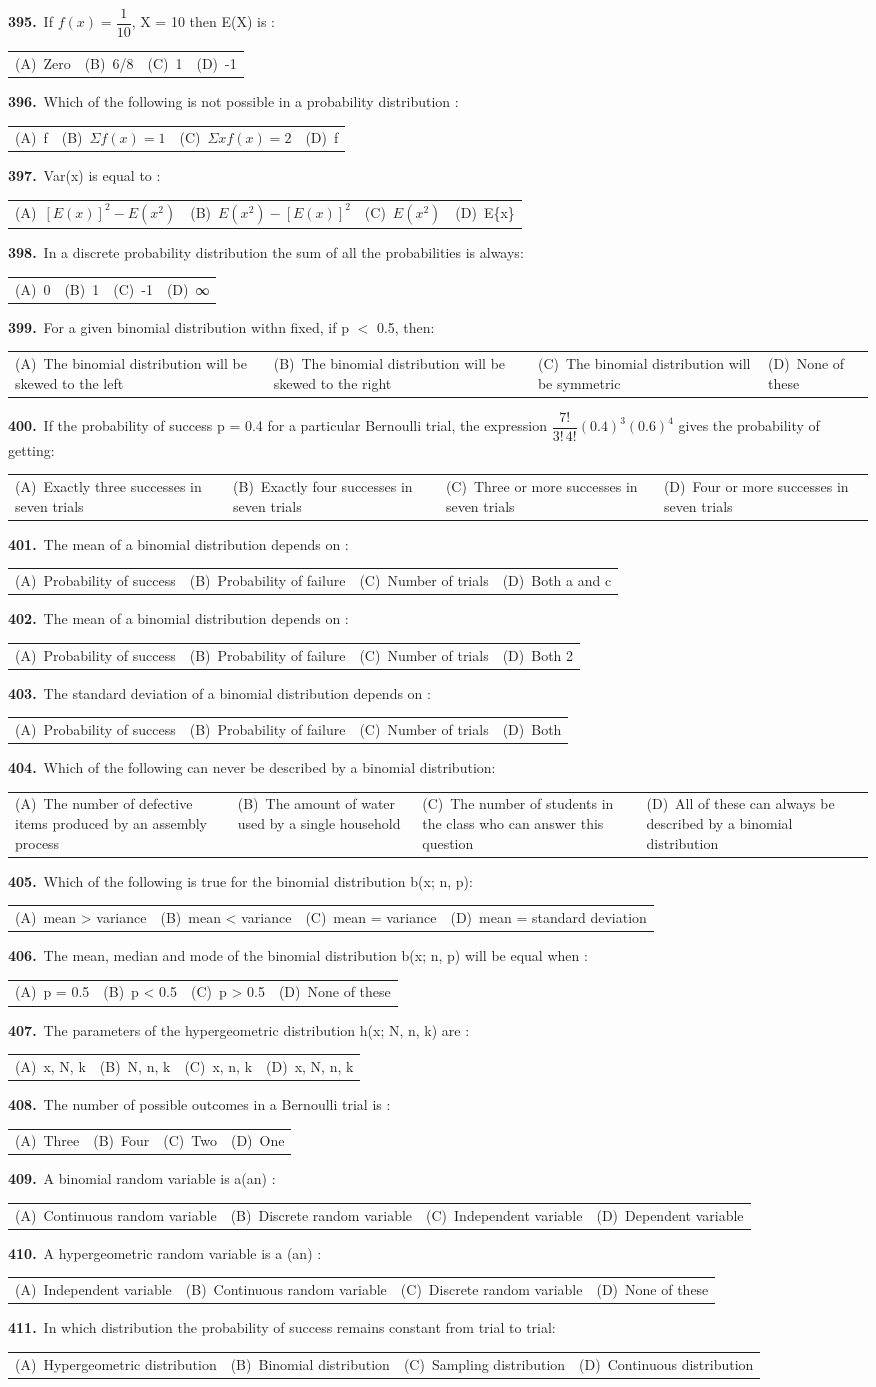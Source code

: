 \documentclass[11pt,a4paper]{article}
\makeatletter
\newcommand{\mcq}[6]{%
  \Needspace{4\baselineskip}%
  \par\medskip\noindent\textbf{#1.}\ #2\par\nopagebreak
  \noindent\begin{tabularx}{\linewidth}{@{\hspace{1.5em}}*{4}{>{\raggedright\arraybackslash}X}@{}}
    (A)~#3 & (B)~#4 & (C)~#5 & (D)~#6
  \end{tabularx}\par}
\makeatother
\begin{document}
\mcq{395}{If $f(x)=\dfrac{1}{10}$, X = 10 then E(X) is :}{Zero}{6/8}{1}{-1}
\mcq{396}{Which of the following is not possible in a probability distribution :}{f}{$\Sigma f(x)=1$}{$\Sigma xf(x)=2$}{f}
\mcq{397}{Var(x) is equal to :}{$[E(x)]^{2}-E(x^{2})$}{$E(x^{2})-[E(x)]^{2}$}{$E(x^{2})$}{E\{x\}}
\mcq{398}{In a discrete probability distribution the sum of all the probabilities is always:}{0}{1}{-1}{∞}
\mcq{399}{For a given binomial distribution withn fixed, if p $<$ 0.5, then:}{The binomial distribution will be skewed to the left}{The binomial distribution will be skewed to the right}{The binomial distribution will be symmetric}{None of these}
\mcq{400}{If the probability of success p = 0.4 for a particular Bernoulli trial, the expression $\dfrac{7!}{3!\,4!}(0.4)^{3}(0.6)^{4}$ gives the probability of getting:}{Exactly three successes in seven trials}{Exactly four successes in seven trials}{Three or more successes in seven trials}{Four or more successes in seven trials}
\mcq{401}{The mean of a binomial distribution depends on :}{Probability of success}{Probability of failure}{Number of trials}{Both a and c}
\mcq{402}{The mean of a binomial distribution depends on :}{Probability of success}{Probability of failure}{Number of trials}{Both 2}
\mcq{403}{The standard deviation of a binomial distribution depends on :}{Probability of success}{Probability of failure}{Number of trials}{Both}
\mcq{404}{Which of the following can never be described by a binomial distribution:}{The number of defective items produced by an assembly process}{The amount of water used by a single household}{The number of students in the class who can answer this question}{All of these can always be described by a binomial distribution}
\mcq{405}{Which of the following is true for the binomial distribution b(x; n, p):}{mean > variance}{mean < variance}{mean = variance}{mean = standard deviation}
\mcq{406}{The mean, median and mode of the binomial distribution b(x; n, p) will be equal when :}{p = 0.5}{p < 0.5}{p > 0.5}{None of these}
\mcq{407}{The parameters of the hypergeometric distribution h(x; N, n, k) are :}{x, N, k}{N, n, k}{x, n, k}{x, N, n, k}
\mcq{408}{The number of possible outcomes in a Bernoulli trial is :}{Three}{Four}{Two}{One}
\mcq{409}{A binomial random variable is a(an) :}{Continuous random variable}{Discrete random variable}{Independent variable}{Dependent variable}
\mcq{410}{A hypergeometric random variable is a (an) :}{Independent variable}{Continuous random variable}{Discrete random variable}{None of these}
\mcq{411}{In which distribution the probability of success remains constant from trial to trial:}{Hypergeometric distribution}{Binomial distribution}{Sampling distribution}{Continuous distribution}
\end{document}
